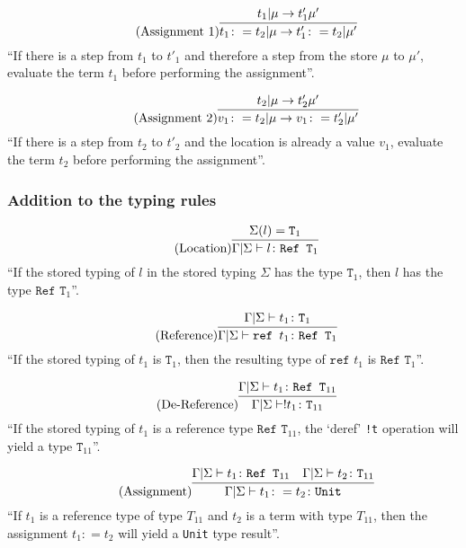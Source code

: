 \begin{equation*}
    \tag{Assignment 1}
    \infer{
        t_1 \colon = t_2 | \mu \rightarrow t'_1 \colon = t_2 | \mu'
    }{
        t_1 | \mu \rightarrow t'_1 \mu'
    }
\end{equation*}
``If there is a step from $t_1$ to $t'_1$ and therefore a step
from the store $\mu$ to $\mu'$, evaluate the term $t_1$ before
performing the assignment''.

\begin{equation*}
    \tag{Assignment 2}
    \infer{
        v_1 \colon = t_2 | \mu \rightarrow v_1 \colon = t'_2 | \mu'
    }{
        t_2 | \mu \rightarrow t'_2 \mu'
    }
\end{equation*}
``If there is a step from $t_2$ to $t'_2$ and the location
is already a value $v_1$, evaluate the term $t_2$ before
performing the assignment''.

\subsubsection{Addition to the typing rules \cite{pierce2002ProgLang}}
\begin{equation*}
    \tag{Location}
    \infer{
        \Gamma | \Sigma \vdash l \colon \texttt{Ref T}_1
    }{
        \Sigma(l) = \texttt{T}_1
    }
\end{equation*}
``If the stored typing of $l$ in the stored typing $\Sigma$ has
the type $\texttt{T}_1$, then $l$ has the type $\texttt{Ref T}_1$''.

\begin{equation*}
    \tag{Reference}
    \infer{
        \Gamma | \Sigma \vdash \texttt{ref } t_1 \colon \texttt{Ref T}_1
    }{
        \Gamma | \Sigma \vdash t_1 \colon \texttt{T}_1
    }
\end{equation*}
``If the stored typing of $t_1$ is $\texttt{T}_1$, then the resulting type
of $\texttt{ref } t_1$ is $\texttt{Ref T}_1$''.

\begin{equation*}
    \tag{De-Reference}
    \infer{
        \Gamma | \Sigma \vdash !t_1 \colon \texttt{T}_{11}
    }{
        \Gamma | \Sigma \vdash t_1 \colon \texttt{Ref T}_{11}
    }
\end{equation*}
``If the stored typing of $t_1$ is a reference type $\texttt{Ref T}_{11}$,
the `deref' \texttt{!t} operation will yield a type $\texttt{T}_{11}$''.

\begin{equation*}
    \tag{Assignment}
    \infer{
        \Gamma | \Sigma \vdash t_1 \colon = t_2 \colon \texttt{Unit}
    }{
        \Gamma | \Sigma \vdash t_1 \colon \texttt{Ref T}_{11}
        &
        \Gamma | \Sigma \vdash t_2 \colon \texttt{T}_{11}
    }
\end{equation*}
``If $t_1$ is a reference type of type $T_{11}$ and $t_2$ is a term
with type $T_{11}$, then the assignment $t_1 \colon = t_2$ will
yield a \texttt{Unit} type result''.
